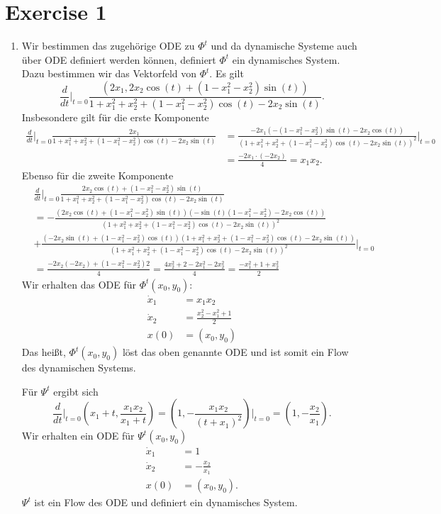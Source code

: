 \documentclass{article}
\theoremstyle{named}
\begin{document}
\section*{Exercise 1}
\begin{enumerate}[label=(\roman*)]
	\item Wir bestimmen das zugehörige ODE zu $\Phi^t$ und da dynamische Systeme auch über ODE definiert werden können, definiert $\Phi^t$ ein dynamisches System. Dazu bestimmen wir das Vektorfeld von $\Phi^t$. Es gilt
	\[
		\frac{d}{dt} \Bigg \vert_{t=0} \frac{(2x_1, 2x_2 \cos(t) + (1-x_1^2-x_2^2) \sin(t))}{1+x_1^2+x_2^2+(1-x_1^2-x_2^2)\cos(t)-2x_2\sin(t)}.
	\]
	Insbesondere gilt für die erste Komponente
	\begin{align*}
		\frac{d}{dt} \Bigg \vert_{t=0} \frac{2x_1}{1+x_1^2+x_2^2+(1-x_1^2-x_2^2)\cos(t)-2x_2\sin(t)} &= \frac{-2x_1(-(1-x_1^2-x_2^2)\sin(t) - 2x_2\cos(t))}{(1+x_1^2+x_2^2+(1-x_1^2-x_2^2)\cos(t)-2x_2\sin(t))^2}  \Bigg \vert_{t=0} \\
		&= \frac{-2x_1 \cdot (-2x_2)}{4} = x_1x_2.
	\end{align*}
	Ebenso für die zweite Komponente
	\begin{align*}
		&\frac{d}{dt} \Bigg \vert_{t=0}
		\frac{2x_2 \cos(t) + (1-x_1^2-x_2^2) \sin(t)}{1+x_1^2+x_2^2+(1-x_1^2-x_2^2)\cos(t)-2x_2\sin(t)}\\ 
		&= 
		-\frac{(2x_2 \cos(t) + (1-x_1^2-x_2^2) \sin(t))(-\sin(t)(1-x_1^2-x_2^2) - 2x_2\cos(t))}{(1+x_1^2+x_2^2+(1-x_1^2-x_2^2)\cos(t)-2x_2\sin(t))^2} \\
		&+
		\frac{(-2x_2\sin(t) + (1-x_1^2-x_2^2)\cos(t))(1+x_1^2+x_2^2+(1-x_1^2-x_2^2)\cos(t)-2x_2\sin(t))}{(1+x_1^2+x_2^2+(1-x_1^2-x_2^2)\cos(t)-2x_2\sin(t))^2} \Bigg \vert_{t=0} \\
		&= \frac{-2x_2(-2x_2) + (1-x_1^2-x_2^2)2}{4} = \frac{4x_2^2+2-2x_1^2-2x_2^2}{4} = \frac{-x_1^2+1+x_2^2}{2}
	\end{align*}
	Wir erhalten das ODE für $\Phi^t(x_0,y_0)$:
	\begin{align*}
		\dot x_1 &= x_1x_2 \\
		\dot x_2 &= \frac{x_2^2-x_1^2+1}{2} \\
		x(0) &= (x_0,y_0)
	\end{align*}
	Das heißt, $\Phi^t(x_0,y_0)$ löst das oben genannte ODE und ist somit ein Flow des dynamischen Systems.
	
	Für  $\Psi^t$ ergibt sich
	\[
		\frac{d}{dt} \Bigg \vert_{t=0} (x_1+t, \frac{x_1x_2}{x_1+t}) = (1, -\frac{x_1x_2}{(t+x_1)^2}) \Bigg \vert_{t=0} = (1,- \frac{x_2}{x_1}).
	\]
	Wir erhalten ein ODE für $\Psi^t(x_0,y_0)$
	\begin{align*}
		\dot x_1 &= 1 \\
		\dot x_2 &= - \frac{x_2}{x_1} \\
		x(0) &= (x_0,y_0).
	\end{align*}
	$\Psi^t$ ist ein Flow des ODE und definiert ein dynamisches System.
	

\end{enumerate}
\end{document}
